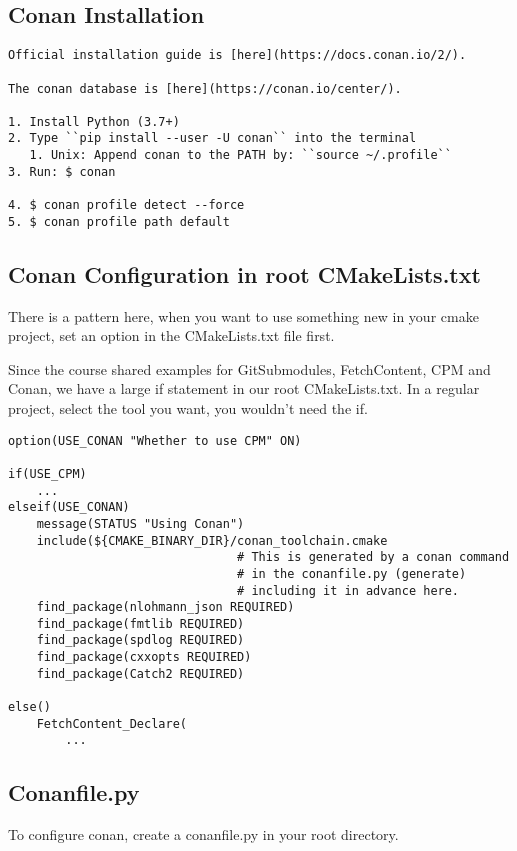 \subsection{Conan Installation}

\begin{verbatim}
Official installation guide is [here](https://docs.conan.io/2/).

The conan database is [here](https://conan.io/center/).

1. Install Python (3.7+)
2. Type ``pip install --user -U conan`` into the terminal
   1. Unix: Append conan to the PATH by: ``source ~/.profile``
3. Run: $ conan

4. $ conan profile detect --force
5. $ conan profile path default
\end{verbatim}


\subsection{Conan Configuration in root CMakeLists.txt}

There is a pattern here, when you want to use something new in your cmake project,
set an option in the CMakeLists.txt file first.

Since the course shared examples for GitSubmodules, FetchContent, CPM and Conan,
we have a large if statement in our root CMakeLists.txt. In a regular project, 
select the tool you want, you wouldn't need the if.

\begin{verbatim}
option(USE_CONAN "Whether to use CPM" ON)

if(USE_CPM)
    ...
elseif(USE_CONAN)
    message(STATUS "Using Conan")
    include(${CMAKE_BINARY_DIR}/conan_toolchain.cmake  
                                # This is generated by a conan command
                                # in the conanfile.py (generate)
                                # including it in advance here.
    find_package(nlohmann_json REQUIRED)
    find_package(fmtlib REQUIRED)
    find_package(spdlog REQUIRED)
    find_package(cxxopts REQUIRED)
    find_package(Catch2 REQUIRED)

else()
    FetchContent_Declare(
        ...
\end{verbatim}

\subsection{Conanfile.py}

To configure conan, create a conanfile.py in your root directory.

